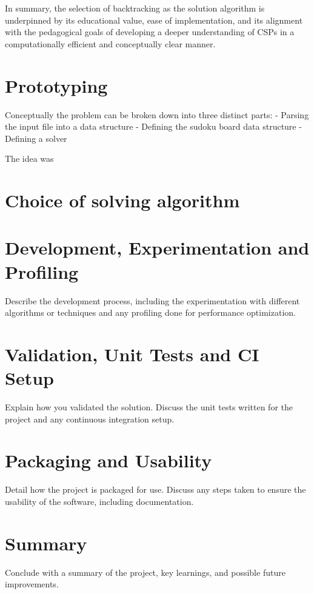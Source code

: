 \documentclass[11pt]{article}
\begin{document}
In summary, the selection of backtracking as the solution algorithm is underpinned by its educational value, ease of implementation, and its alignment with the pedagogical goals of developing a deeper understanding of CSPs in a computationally efficient and conceptually clear manner.

\section{Prototyping}
Conceptually the problem can be broken down into three distinct parts:
 - Parsing the input file into a data structure
 - Defining the sudoku board data structure
 - Defining a solver

 The idea was

\section{Choice of solving algorithm}
\section{Development, Experimentation and Profiling}
Describe the development process, including the experimentation with different algorithms or techniques and any profiling done for performance optimization.

\section{Validation, Unit Tests and CI Setup}
Explain how you validated the solution. Discuss the unit tests written for the project and any continuous integration setup.

\section{Packaging and Usability}
Detail how the project is packaged for use. Discuss any steps taken to ensure the usability of the software, including documentation.

\section{Summary}
Conclude with a summary of the project, key learnings, and possible future improvements.

%
%
\end{document}
